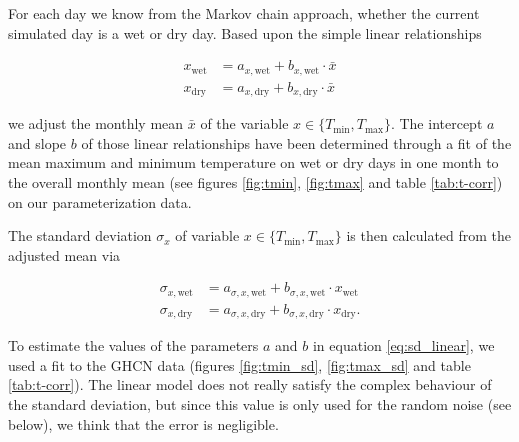 \begin{refsection}
For each day we know from the Markov chain approach, whether the current simulated day is a wet or dry day. Based upon the simple linear relationships

\begin{align}
	x_\mathrm{wet} &= a_{x, \mathrm{wet}} + b_{x, \mathrm{wet}} \cdot \bar{x} \nonumber \\
	x_\mathrm{dry} &= a_{x, \mathrm{dry}} + b_{x, \mathrm{dry}} \cdot \bar{x} \label{eq:linear}
\end{align}

we adjust the monthly mean $\bar{x}$ of the variable $x\in\{T_\mathrm{min}, T_\mathrm{max}\}$. The intercept $a$ and slope $b$ of those linear relationships have been determined through a fit of the mean maximum and minimum temperature on wet or dry days in one month to the overall monthly mean (see figures \ref{fig:tmin}, \ref{fig:tmax} and table \ref{tab:t-corr}) on our parameterization data.

The standard deviation  $\sigma_x$ of variable $x\in\{T_\mathrm{min}, T_\mathrm{max}\}$ is then calculated from the adjusted mean via

\begin{align}
	\sigma_{x, \mathrm{wet}} &= a_{\sigma, x, \mathrm{wet}} + b_{\sigma, x, \mathrm{wet}} \cdot x_\mathrm{wet} \nonumber \\
	\sigma_{x, \mathrm{dry}} &= a_{\sigma, x, \mathrm{dry}} + b_{\sigma, x, \mathrm{dry}} \cdot x_\mathrm{dry}. \label{eq:sd_linear}
\end{align}

To estimate the values of the parameters $a$ and $b$ in equation \eqref{eq:sd_linear}, we used a fit to the GHCN data (figures \ref{fig:tmin_sd}, \ref{fig:tmax_sd} and table \ref{tab:t-corr}). The linear model does not really satisfy  the complex behaviour of the standard deviation, but since this value is only used for the random noise (see below), we think that the error is negligible.


\end{refsection}
